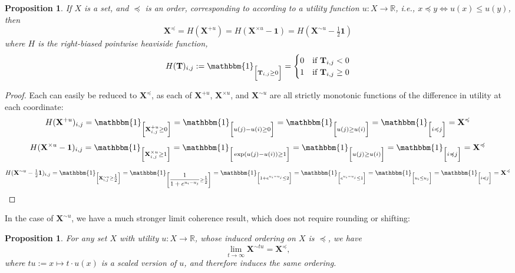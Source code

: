 \documentclass{article}
\theoremstyle{plain}
\newtheorem{prop}[theorem]{Proposition}
\theoremstyle{definition}
\theoremstyle{remark}
\newcommand\leqc{\preccurlyeq}
\newcommand\mat[1]{\mathbf #1}
\newcommand{\indi}[1]{\mathbbm{1}_{\left[\vphantom{\big[}#1 \vphantom{\big]}\right]}}
\begin{document}
	\begin{prop}
		If $X$ is a set, and $\leqc$ is an order, corresponding to according to a utility function $u : X \to \mathbb R$, i.e., $x \leqc y \Leftrightarrow u(x) \leq u(y)$, then 
		\[
			\mat X^\leqc = H(\mat X^{+u} ) 
	 		 = H(\mat X^{\times u} - \mat 1)
	 		 = H(\mat X^{\sim u} - \tfrac{1}{2}\mat 1)
		\]
		where $H$ is the right-biased pointwise heaviside function, 
		\[H(\mat T)_{i,j} := \indi{\mat T_{i,j} \geq 0} = \begin{cases} 0 & \text{if}~\mat T_{i,j} < 0 \\ 1 & \text{if}~\mat T_{i,j} \geq 0\end{cases}\]
	\end{prop}
	\begin{proof} Each can easily be reduced to $\mat X^\leqc$, as each of $\mat X^{+u}$, $\mat X^{\times u}$, and $\mat X^{\sim u}$ are all strictly monotonic functions of the difference in utility at each coordinate:
		\begin{equation*}
			H(\mat X^{+u} )_{i,j} = \indi{\mat X^{+u}_{i,j} \geq 0} = \indi{u(j) - u(i) \geq 0} = \indi{u(j) \geq u(i)} = \indi{i \leqc j} = \mat X^\leqc 
		\end{equation*}
		\begin{equation*}
			H(\mat X^{\times u} - \mat 1)_{i,j} = \indi{\mat X^{\times u}_{i,j} \geq 1} = \indi{\exp(u(j) - u(i)) \geq 1} = \indi{u(j) \geq u(i)} = \indi{i \leqc j} = \mat X^\leqc 
		\end{equation*}
		\begin{equation*}
		H(\mat X^{\sim u} -\tfrac{1}{2} \mat 1)_{i,j} = \indi{ \mat X^{\sim u}_{i,j} \geq \tfrac{1}{2}} = \indi{\dfrac{1}{1 + e^{u_i - u_j}} \geq \tfrac{1}{2}} 	
			= \indi{1 + e^{u_i - u_j} \leq 2}= \indi{e^{u_i - u_j} \leq 1} = \indi{u_i \leq u_j} = \indi{i \leqc j} = \mat X^\leqc 
		\end{equation*}
	\end{proof}

	In the case of $\mat X^{\sim u}$, we have a much stronger limit coherence result, which does not require rounding or shifting:
	\begin{prop} For any set $X$ with utility $u : X \to \mathbb R$, whose induced ordering on $X$ is $\leqc$, we have
		\[ \lim\limits_{t \to \infty} \mat X^{\sim t u} = \mat X^\leqc, \]
	where $tu := x \mapsto t\cdot u(x)$ is a scaled version of $u$, and therefore induces the same ordering.
	\end{prop}
\end{document}
